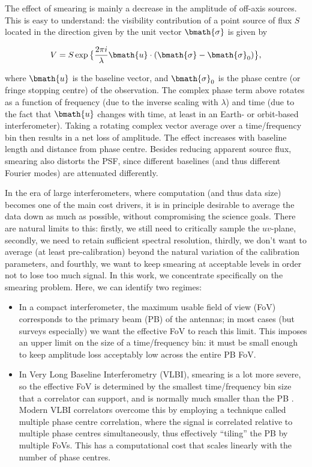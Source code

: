 \documentclass[useAMS,usenatbib]{mn2e}
\begin{document}
The effect of smearing is mainly a decrease in the amplitude of off-axis sources. This is easy to understand: the visibility contribution of a point source of flux $S$ located in the direction given by the unit vector $\bmath{\sigma}$ is given by

\begin{equation}
V = S \exp \big \{  \frac{2\pi i}{\lambda} \bmath{u}\cdot(\bmath{\sigma}-\bmath{\sigma}_0) \big \},
\end{equation}

where $\bmath{u}$ is the baseline vector, and $\bmath{\sigma}_0$ is the phase centre (or fringe stopping centre) of the observation.
The complex phase term above rotates as a function of frequency (due to the inverse scaling with $\lambda$) and time (due to
the fact that $\bmath{u}$ changes with time, at least in an Earth- or orbit-based interferometer). 
Taking a rotating complex vector average over a time/frequency bin then results  in a net loss of amplitude. The effect increases 
with baseline length and distance from phase centre. Besides reducing apparent source flux, smearing also distorts the PSF, since different baselines (and thus different Fourier modes) are attenuated differently.

In the era of large interferometers, where computation (and thus data size) becomes one of the main cost drivers, it is 
in principle desirable to average the data down as much as possible, without compromising the science goals. There are natural limits to this: firstly, we still need to critically sample the $uv$-plane, secondly, we need to retain sufficient spectral resolution, thirdly, we don't want to average (at least pre-calibration) beyond the natural variation of the calibration parameters, and fourthly, we want to keep smearing at acceptable levels in order not to lose too much signal. In this work, we concentrate specifically on the smearing problem. Here, we can identify two regimes:

\begin{itemize}
\item In a compact interferometer, the maximum usable field of view (FoV) corresponds to the primary beam (PB) of the antennas; in
most cases (but surveys especially) we want the effective FoV to reach this limit. This imposes an upper limit on the size of a 
time/frequency bin: it must be small enough to keep amplitude loss acceptably low across the entire PB FoV. 
\item In Very Long Baseline Interferometry (VLBI), smearing is a lot more severe, so the effective FoV is determined by the smallest time/frequency bin size that a
correlator can support, and is normally much smaller than the PB \citep[for an extensive discussion see][]{keipema2015sfxc}. Modern VLBI correlators overcome this by employing a technique 
called multiple phase centre correlation, where the signal is correlated relative to multiple phase centres simultaneously, thus
effectively ``tiling'' the PB by multiple FoVs. This has a computational cost that scales linearly with the number of phase centres.
\end{itemize}
\end{document}
